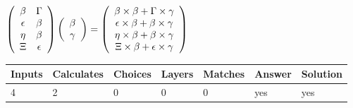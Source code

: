\documentclass[12pt]{article}
\begin{document}
$  %
 \left( \begin{array}
 {
 c
 c
 }
 \beta & 
 \Gamma \\ 
 \epsilon & 
 \beta \\ 
 \eta & 
 \beta \\ 
                    \Xi & 
 \epsilon
 \end{array} \right)
 \left( \begin{array}
 {
 c
 }
 \beta \\ 
 \gamma
 \end{array} \right)
=
  \left( \begin{array}
 {
 c
 }
 \beta \times  \beta   +  \Gamma \times  \gamma \\ 
 \epsilon \times  \beta   +  \beta \times  \gamma \\ 
 \eta \times  \beta   +  \beta \times  \gamma \\ 
                    \Xi \times  \beta   +  \epsilon \times  \gamma
 \end{array} \right)
$
 
 
 
\noindent{}
 
 

 
 
 
\noindent{}
 
 

 
 
\noindent{}
 
 

 
\vspace{0.3in}
   
   
   
   
\noindent\begin{tabular}{|l|l|l|l|l|l|l|}
 \hline
Inputs & Calculates & Choices & Layers & Matches & Answer & Solution \\ \hline
           4 & 
           2 & 
           0
  & 
           0 & 
           0 & 
  yes & 
  yes 
  \\ \hline
 \end{tabular}
   
   
   
   
\noindent{}
   
\end{document}

